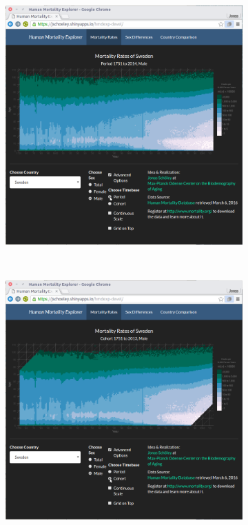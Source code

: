 \documentclass[
  12pt
]{scrartcl}
\begin{document}
\begin{figure}[!htb]
  \begin{subfigure}[t]{0.5\textwidth}
    \centering
    \includegraphics[width = \textwidth]{./fig/hmd_screen_period.png}
    \label{fig:mx_period}
    \end{subfigure}%
  ~
    \begin{subfigure}[t]{0.5\textwidth}
    \includegraphics[width = \textwidth]{./fig/hmd_screen_cohort.png}

\end{subfigure}
\end{figure}
\end{document}
